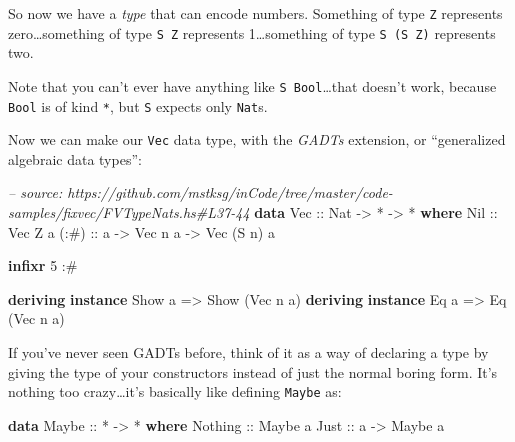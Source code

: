\documentclass[]{article}
\newenvironment{Shaded}{}{}
\newcommand{\KeywordTok}[1]{\textcolor[rgb]{0.00,0.44,0.13}{\textbf{{#1}}}}
\newcommand{\DataTypeTok}[1]{\textcolor[rgb]{0.56,0.13,0.00}{{#1}}}
\newcommand{\DecValTok}[1]{\textcolor[rgb]{0.25,0.63,0.44}{{#1}}}
\newcommand{\CommentTok}[1]{\textcolor[rgb]{0.38,0.63,0.69}{\textit{{#1}}}}
\newcommand{\OtherTok}[1]{\textcolor[rgb]{0.00,0.44,0.13}{{#1}}}
\newcommand{\FunctionTok}[1]{\textcolor[rgb]{0.02,0.16,0.49}{{#1}}}
\newcommand{\NormalTok}[1]{{#1}}
\begin{document}
So now we have a \emph{type} that can encode numbers. Something of type
\texttt{Z} represents zero\ldots{}something of type \texttt{S\ Z} represents
1\ldots{}something of type \texttt{S\ (S\ Z)} represents two.

Note that you can't ever have anything like \texttt{S\ Bool}\ldots{}that doesn't
work, because \texttt{Bool} is of kind \texttt{*}, but \texttt{S} expects only
\texttt{Nat}s.

Now we can make our \texttt{Vec} data type, with the \emph{GADTs} extension, or
``generalized algebraic data types'':

\begin{Shaded}
\begin{Highlighting}[]
\CommentTok{-- source: https://github.com/mstksg/inCode/tree/master/code-samples/fixvec/FVTypeNats.hs#L37-44}
\KeywordTok{data} \DataTypeTok{Vec}\OtherTok{ ::} \DataTypeTok{Nat} \OtherTok{->} \FunctionTok{*} \OtherTok{->} \FunctionTok{*} \KeywordTok{where}
    \DataTypeTok{Nil}\OtherTok{  ::} \DataTypeTok{Vec} \DataTypeTok{Z} \NormalTok{a}
\OtherTok{    (:#) ::} \NormalTok{a }\OtherTok{->} \DataTypeTok{Vec} \NormalTok{n a }\OtherTok{->} \DataTypeTok{Vec} \NormalTok{(}\DataTypeTok{S} \NormalTok{n) a}

\KeywordTok{infixr} \DecValTok{5} \FunctionTok{:#}

\KeywordTok{deriving} \KeywordTok{instance} \DataTypeTok{Show} \NormalTok{a }\OtherTok{=>} \DataTypeTok{Show} \NormalTok{(}\DataTypeTok{Vec} \NormalTok{n a)}
\KeywordTok{deriving} \KeywordTok{instance} \DataTypeTok{Eq} \NormalTok{a }\OtherTok{=>} \DataTypeTok{Eq} \NormalTok{(}\DataTypeTok{Vec} \NormalTok{n a)}
\end{Highlighting}
\end{Shaded}

If you've never seen GADTs before, think of it as a way of declaring a type by
giving the type of your constructors instead of just the normal boring form.
It's nothing too crazy\ldots{}it's basically like defining \texttt{Maybe} as:

\begin{Shaded}
\begin{Highlighting}[]
\KeywordTok{data} \DataTypeTok{Maybe}\OtherTok{ ::} \FunctionTok{*} \OtherTok{->} \FunctionTok{*} \KeywordTok{where}
    \DataTypeTok{Nothing}\OtherTok{ ::} \DataTypeTok{Maybe} \NormalTok{a}
    \DataTypeTok{Just}\OtherTok{    ::} \NormalTok{a }\OtherTok{->} \DataTypeTok{Maybe} \NormalTok{a}
\end{Highlighting}
\end{Shaded}
\end{document}
